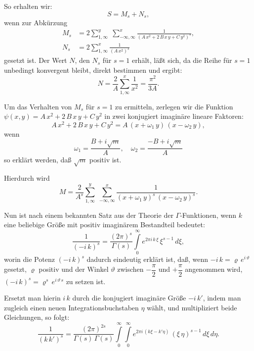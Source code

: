 \documentclass[12pt,a4paper]{article}
\theoremstyle{definition}
\begin{document}
So erhalten wir:
\begin{equation}
S = M_{s} + N_{s},
\end{equation}
wenn zur Abkürzung
\begin{align}
M_{s} &= 2\sum_{1,\infty}^{y}\;\sum_{-\infty,\infty}^{x}
\frac{1}{(A\,x^{2} + 2\,B\,x\,y + C\,y^{2})^{s}},\\
N_{s} &= 2\sum_{1,\infty}^{x} \frac{1}{(A\,x^{2})^{s}}
\end{align}
gesetzt ist. Der Wert $N$, den $N_{s}$ für $s = 1$ erhält, läßt sich, da 
die Reihe für $s = 1$ unbedingt konvergent bleibt, direkt bestimmen und 
ergibt:
\begin{equation}
N = \frac{2}{A}\sum_{1,\infty}^{x} \frac{1}{x^{2}} = \frac{\pi^{2}}{3A}.
\end{equation}

Um das Verhalten von $M_{s}$ für $s = 1$ zu ermitteln, zerlegen wir die 
Funktion $\psi(x,y) = A\,x^{2} + 2\,B\,x\,y + C\,y^{2}$ in zwei konjugiert 
imaginäre lineare Faktoren:
\[
A\,x^{2} + 2\,B\,x\,y + C\,y^{2} = A\,(x + \omega_{1}\,y)\,(x - \omega_{2}\,y),
\]
wenn
\begin{equation}
\omega_{1} = \frac{B + i\sqrt{m}}{A},\quad
\omega_{2} = \frac{-B + i\sqrt{m}}{A}
\end{equation}
so erklärt werden, daß $\sqrt{m}$ positiv ist.

Hierdurch wird
\begin{equation}
M = \frac{2}{A^{s}} \sum_{1,\infty}^{y}\;\sum_{-\infty,\infty}^{x}
\frac{1}{(x + \omega_{1}\,y)^{s}\,(x - \omega_{2}\,y)^{s}}.
\end{equation}


Nun ist nach einem bekannten Satz aus der Theorie der 
$\Gamma$-Funktionen, wenn $k$ eine beliebige Größe mit positiv imaginärem 
Bestandteil bedeutet:
\[
\frac{1}{(-i\,k)^{s}} = \frac{(2\pi)^{s}}{\Gamma(s)}
\int\limits_{0}^{\infty} e^{2\pi i\,k\,\xi}\,\xi^{s-1}\,d\xi,
\]
worin die Potenz $(-i\,k)^{s}$ dadurch eindeutig erklärt ist, daß, wenn 
$-i\,k = \varrho\,e^{i\,\vartheta}$ gesetzt, $\varrho$ positiv und der Winkel 
$\vartheta$ zwischen $-\dfrac{\pi}{2}$ und $+\dfrac{\pi}{2}$ angenommen wird, 
$(-i\,k)^{s} = \varrho^{s}\,e^{i\,\vartheta\,s}$ zu setzen ist.

Ersetzt man hierin $i\,k$ durch die konjugiert imaginäre Größe $-i\,k'$, 
indem man zugleich einen neuen Integrationsbuchstaben $\eta$ wählt, und 
multipliziert beide Gleichungen, so folgt:
\begin{equation}
\frac{1}{(k\,k')^{s}} = \frac{(2\pi)^{2s}}{\Gamma(s)\,\Gamma(s)}
\int\limits_{0}^{\infty}\!\int\limits_{0}^{\infty}
e^{2\pi i\,(k\xi - k'\eta)}\,(\xi\,\eta)^{s-1}\,d\xi\,d\eta.
\end{equation}
\end{document}
